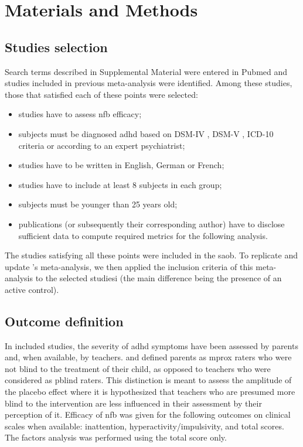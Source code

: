 

\section{Materials and Methods}

\subsection{Studies selection}

Search terms described in Supplemental Material were entered in Pubmed and studies included in previous meta-analysis were identified. Among these studies, those that
satisfied each of these points were selected:
\begin{itemize}
	\item studies have to assess \gls{nfb} efficacy; 
	\item subjects must be diagnosed \gls{adhd} based on DSM-IV \citep{DSM-4}, DSM-V \citep{DSM-5}, ICD-10 \citep{ICD101993} 
	criteria or according to an expert psychiatrist; 
	\item studies have to be written in English, German or French;
	\item studies have to include at least 8 subjects in each group;
	\item subjects must be younger than 25 years old;
  \item publications (or subsequently their corresponding author) have to disclose sufficient data to compute required metrics for the following analysis.
\end{itemize} 
The studies satisfying all these points were included in the \gls{saob}. To replicate and update \citeauthor{Cortese2016}'s meta-analysis, we then applied the inclusion 
criteria of this meta-analysis to the selected studiesi (the main difference being the presence of an active control). 

\subsection{Outcome definition} 

In included studies, the severity of \gls{adhd} symptoms have been assessed by parents and, when available, by teachers. \citet{Cortese2016} 
and \citet{Micoulaud2014} defined parents as \gls{mprox} raters who were not blind to the treatment of their child, as opposed to 
teachers who were considered as \gls{pblind} raters. This distinction is meant to assess the amplitude of the placebo effect where 
it is hypothesized that teachers who are presumed more blind to the intervention are less influenced in their assessment by their perception of it. 
Efficacy of \gls{nfb} was given for the following outcomes on clinical scales when available: inattention, 
hyperactivity/impulsivity, and total scores. The factors analysis was performed using the total score only.

